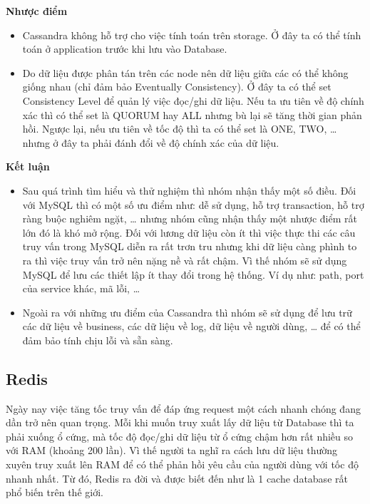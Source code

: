             \textbf{Nhược điểm}
            
            \begin{itemize}
                \item Cassandra không hỗ trợ cho việc tính toán trên storage. Ở đây ta có thể tính toán ở application trước khi lưu vào Database.
                \item Do dữ liệu được phân tán trên các node nên dữ liệu giữa các có thể không giống nhau (chỉ đảm bảo Eventually Consistency). Ở đây ta có thể set Consistency Level để quản lý việc đọc/ghi dữ liệu. Nếu ta ưu tiên về độ chính xác thì có thể set là QUORUM hay ALL nhưng bù lại sẽ tăng thời gian phản hồi. Ngược lại, nếu ưu tiên về tốc độ thì ta có thể set là ONE, TWO, … nhưng ở đây ta phải đánh đổi về độ chính xác của dữ liệu.
            \end{itemize}
            
            \textbf{Kết luận}
            
            \begin{itemize}
                \item Sau quá trình tìm hiểu và thử nghiệm thì nhóm nhận thấy một số điều. Đối với MySQL thì có một số ưu điểm như: dễ sử dụng, hỗ trợ transaction, hỗ trợ ràng buộc nghiêm ngặt, … nhưng nhóm cũng nhận thấy một nhược điểm rất lớn đó là khó mở rộng. Đối với lương dữ liệu còn ít thì việc thực thi các câu truy vấn trong MySQL diễn ra rất trơn tru nhưng khi dữ liệu càng phình to ra thì việc truy vấn trở nên nặng nề và rất chậm. Vì thế nhóm sẽ sử dụng MySQL để lưu các thiết lập ít thay đổi trong hệ thống. Ví dụ như: path, port của service khác, mã lỗi, …
                \item Ngoài ra với những ưu điểm của Cassandra thì nhóm sẽ sử dụng để lưu trữ các dữ liệu về business, các dữ liệu về log, dữ liệu về người dùng, … để có thể đảm bảo tính chịu lỗi và sẵn sàng.
            \end{itemize}
            \subsection{Redis}
            
            Ngày nay việc tăng tốc truy vấn để đáp ứng request một cách nhanh chóng đang dần trở nên quan trọng. Mỗi khi muốn truy xuất lấy dữ liệu từ Database thì ta phải xuống ổ cứng, mà tốc độ đọc/ghi dữ liệu từ ổ cứng chậm hơn rất nhiều so với RAM (khoảng 200 lần). Vì thế người ta nghĩ ra cách lưu dữ liệu thường xuyên truy xuất lên RAM để có thể phản hồi yêu cầu của người dùng với tốc độ nhanh nhất. Từ đó, Redis ra đời và được biết đến như là 1 cache database rất phổ biến trên thế giới.\\
            
